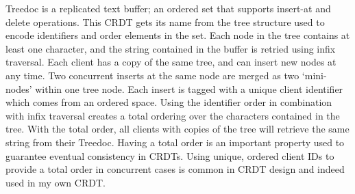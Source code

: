 \documentclass[12pt,a4paper,twoside,openright]{report}
\begin{document}
Treedoc \cite{preguica2009} is a replicated text buffer; an ordered set that supports insert-at and delete operations. This CRDT gets its name from the tree structure used to encode identifiers and order elements in the set. Each node in the tree contains at least one character, and the string contained in the buffer is retried using infix traversal. Each client has a copy of the same tree, and can insert new nodes at any time. Two concurrent inserts at the same node are merged as two `mini-nodes' within one tree node. Each insert is tagged with a unique client identifier which comes from an ordered space. Using the identifier order in combination with infix traversal creates a total ordering over the characters contained in the tree. With the total order, all clients with copies of the tree will retrieve the same string from their Treedoc. Having a total order is an important property used to guarantee eventual consistency in CRDTs. Using unique, ordered client IDs to provide a total order in concurrent cases is common in CRDT design and indeed used in my own CRDT.
\end{document}
